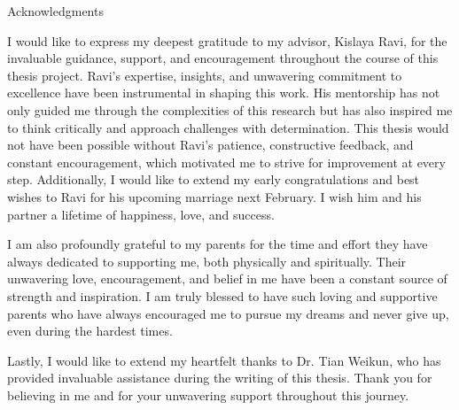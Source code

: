\thispagestyle{empty}

\vspace*{20mm}

\begin{center}
    { Acknowledgments}
\end{center}

\vspace{10mm}

I would like to express my deepest gratitude to my advisor, Kislaya Ravi, for the invaluable guidance, support, and encouragement throughout the course of this thesis project. 
Ravi's expertise, insights, and unwavering commitment to excellence have been instrumental in shaping this work. 
His mentorship has not only guided me through the complexities of this research but has also inspired me to think critically and approach challenges with determination. 
This thesis would not have been possible without Ravi's patience, constructive feedback, and constant encouragement, which motivated me to strive for improvement at every step.
Additionally, I would like to extend my early congratulations and best wishes to Ravi for his upcoming marriage next February. I wish him and his partner a lifetime of happiness, love, and success.

I am also profoundly grateful to my parents for the time and effort they have always dedicated to supporting me, both physically and spiritually. Their unwavering love, encouragement, and belief in me have been a constant source of strength and inspiration. I am truly blessed to have such loving and supportive parents who have always encouraged me to pursue my dreams and never give up, even during the hardest times.

Lastly, I would like to extend my heartfelt thanks to Dr. Tian Weikun, who has provided invaluable assistance during the writing of this thesis. Thank you for believing in me and for your unwavering support throughout this journey.

\cleardoublepage{}
